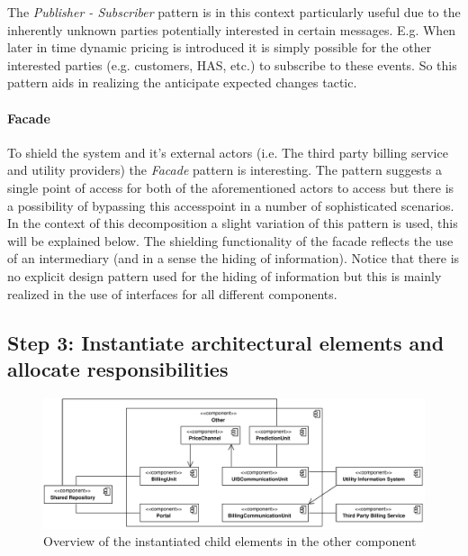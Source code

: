 \npar The \emph{Publisher - Subscriber} pattern is in this context particularly useful due to
the inherently unknown parties potentially interested in certain messages. E.g. When
later in time dynamic pricing is introduced it is simply possible for the other
interested parties (e.g. customers, HAS, etc.) to subscribe to these events. So
this pattern aids in realizing the anticipate expected changes tactic.

\paragraph{Facade}

\npar To shield the system and it's external actors (i.e. The third party
billing service and utility providers) the \emph{Facade} pattern is interesting.
The pattern suggests a single point of access for both of the aforementioned
actors to access but there is a possibility of bypassing this accesspoint in a
number of sophisticated scenarios. In the context of this decomposition a slight
variation of this pattern is used, this will be explained below. The shielding
functionality of the facade reflects the use of an intermediary (and in a sense
the hiding of information). Notice that there is no explicit design pattern used
for the hiding of information but this is mainly realized in the use of
interfaces for all different components.

\subsection{Step 3: Instantiate architectural elements and allocate responsibilities}
\label{add:it10/elements}

\begin{figure}[H]
	\begin{centering}
		\includegraphics[width=\textwidth]{figs/add-it10-elements.pdf}
		\caption{Overview of the instantiated child elements in the other component}
		\label{fig:add/it10/decomposition}
	\end{centering}
\end{figure}


